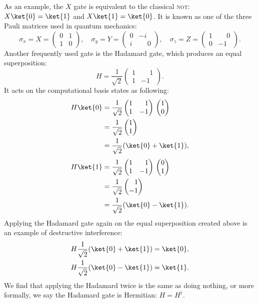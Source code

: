\documentclass[a4paper,10pt]{article}
\newcommand{\qstatezero}{
	\begin{pmatrix}1 \\ 0\end{pmatrix}
}
\newcommand{\qstateone}{
	\begin{pmatrix}0 \\ 1\end{pmatrix}
}
\newcommand{\hgate}{
	\dfrac{1}{\sqrt2}
	\begin{pmatrix}
		1 & \phantom{-}1 \\
		1 & -1
	\end{pmatrix}
}
\begin{document}
As an example, the $X$ gate is equivalent to the classical \textsc{not}: $X\ket{0} = \ket{1}$ and $X\ket{1} = \ket{0}$.
It is known as one of the three Pauli matrices used in quantum mechanics:
\begin{equation} \label{eq:paulis}
\sigma_x = X =
\begin{pmatrix}
0 & 1 \\
1 & 0
\end{pmatrix},
\quad
\sigma_y = Y =
\begin{pmatrix}
0 & -i \\
i & \phantom{-}0
\end{pmatrix},
\quad
\sigma_z = Z =
\begin{pmatrix}
1 & \phantom{-}0 \\
0 & -1
\end{pmatrix}.
\end{equation}
Another frequently used gate is the Hadamard gate, which produces an equal superposition:
\begin{equation}
H = \hgate{}.
\end{equation}
It acts on the computational basis states as following:
\begin{equation}
\begin{aligned}
H\ket{0} &=
\hgate{}
\qstatezero{} \\
&=
\dfrac{1}{\sqrt2}
\begin{pmatrix}1 \\ 1\end{pmatrix} \\
&= \dfrac{1}{\sqrt2}(\ket{0} + \ket{1}),
\end{aligned}
\end{equation}
\begin{equation}
\begin{aligned}
H\ket{1} &=
\hgate{}
\qstateone{} \\
&=
\dfrac{1}{\sqrt2}
\begin{pmatrix}\phantom{-}1 \\ -1\end{pmatrix} \\
&= \dfrac{1}{\sqrt2}(\ket{0} - \ket{1}).
\end{aligned}
\end{equation}
Applying the Hadamard gate again on the equal superposition created above is an example of destructive interference:
\begin{align}
H\dfrac{1}{\sqrt2}(\ket{0} + \ket{1}) &= \ket{0}, \\
H\dfrac{1}{\sqrt2}(\ket{0} - \ket{1}) &= \ket{1}.
\end{align}
We find that applying the Hadamard twice is the same as doing nothing, or more formally, we say the Hadamard gate is Hermitian: $H = H^\dagger$.
\end{document}

